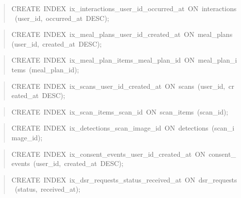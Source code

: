 \begin{quote}\scriptsize\ttfamily\raggedright
CREATE\ INDEX\ ix\_\allowbreak{}interactions\_\allowbreak{}user\_\allowbreak{}id\_\allowbreak{}occurred\_\allowbreak{}at\ ON\ interactions\ (user\_\allowbreak{}id,\ occurred\_\allowbreak{}at\ DESC);
\end{quote}
\begin{quote}\scriptsize\ttfamily\raggedright
CREATE\ INDEX\ ix\_\allowbreak{}meal\_\allowbreak{}plans\_\allowbreak{}user\_\allowbreak{}id\_\allowbreak{}created\_\allowbreak{}at\ ON\ meal\_\allowbreak{}plans\ (user\_\allowbreak{}id,\ created\_\allowbreak{}at\ DESC);
\end{quote}
\begin{quote}\scriptsize\ttfamily\raggedright
CREATE\ INDEX\ ix\_\allowbreak{}meal\_\allowbreak{}plan\_\allowbreak{}items\_\allowbreak{}meal\_\allowbreak{}plan\_\allowbreak{}id\ ON\ meal\_\allowbreak{}plan\_\allowbreak{}items\ (meal\_\allowbreak{}plan\_\allowbreak{}id);
\end{quote}
\begin{quote}\scriptsize\ttfamily\raggedright
CREATE\ INDEX\ ix\_\allowbreak{}scans\_\allowbreak{}user\_\allowbreak{}id\_\allowbreak{}created\_\allowbreak{}at\ ON\ scans\ (user\_\allowbreak{}id,\ created\_\allowbreak{}at\ DESC);
\end{quote}
\begin{quote}\scriptsize\ttfamily\raggedright
CREATE\ INDEX\ ix\_\allowbreak{}scan\_\allowbreak{}items\_\allowbreak{}scan\_\allowbreak{}id\ ON\ scan\_\allowbreak{}items\ (scan\_\allowbreak{}id);
\end{quote}
\begin{quote}\scriptsize\ttfamily\raggedright
CREATE\ INDEX\ ix\_\allowbreak{}detections\_\allowbreak{}scan\_\allowbreak{}image\_\allowbreak{}id\ ON\ detections\ (scan\_\allowbreak{}image\_\allowbreak{}id);
\end{quote}
\begin{quote}\scriptsize\ttfamily\raggedright
CREATE\ INDEX\ ix\_\allowbreak{}consent\_\allowbreak{}events\_\allowbreak{}user\_\allowbreak{}id\_\allowbreak{}created\_\allowbreak{}at\ ON\ consent\_\allowbreak{}events\ (user\_\allowbreak{}id,\ created\_\allowbreak{}at\ DESC);
\end{quote}
\begin{quote}\scriptsize\ttfamily\raggedright
CREATE\ INDEX\ ix\_\allowbreak{}dsr\_\allowbreak{}requests\_\allowbreak{}status\_\allowbreak{}received\_\allowbreak{}at\ ON\ dsr\_\allowbreak{}requests\ (status,\ received\_\allowbreak{}at);
\end{quote}
